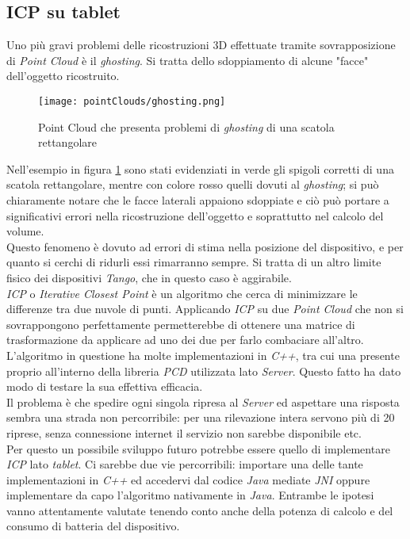 \subsection{ICP su tablet}
Uno più gravi problemi delle ricostruzioni 3D effettuate tramite sovrapposizione di \emph{Point Cloud} è il \emph{ghosting}. Si tratta dello sdoppiamento di alcune "facce" dell'oggetto ricostruito.\\
\begin{figure}[!h] 
    \centering 
    \texttt{[image: pointClouds/ghosting.png]} 
    \caption{Point Cloud che presenta problemi di \emph{ghosting} di una scatola rettangolare}
    \label{figure:pcloud_ghosting}
\end{figure}
Nell'esempio in figura \ref{figure:pcloud_ghosting} sono stati evidenziati in verde gli spigoli corretti di una scatola rettangolare, mentre con colore rosso quelli dovuti al \emph{ghosting}; si può chiaramente notare che le facce laterali appaiono sdoppiate e ciò può portare a significativi errori nella ricostruzione dell'oggetto e soprattutto nel calcolo del volume.\\
Questo fenomeno è dovuto ad errori di stima nella posizione del dispositivo, e per quanto si cerchi di ridurli essi rimarranno sempre. Si tratta di un altro limite fisico dei dispositivi \emph{Tango}, che in questo caso è aggirabile.\\
\emph{ICP} o \emph{Iterative Closest Point} è un algoritmo che cerca di minimizzare le differenze tra due nuvole di punti. Applicando \emph{ICP} su due \emph{Point Cloud} che non si sovrappongono perfettamente permetterebbe di ottenere una matrice di trasformazione da applicare ad uno dei due per farlo combaciare all'altro. L'algoritmo in questione ha molte implementazioni in \emph{C++}, tra cui una presente proprio all'interno della libreria \emph{PCD} utilizzata lato \emph{Server}. Questo fatto ha dato modo di testare la sua effettiva efficacia.\\
Il problema è che spedire ogni singola ripresa al \emph{Server} ed aspettare una risposta sembra una strada non percorribile: per una rilevazione intera servono più di 20 riprese, senza connessione internet il servizio non sarebbe disponibile etc.\\
Per questo un possibile sviluppo futuro potrebbe essere quello di implementare \emph{ICP} lato \emph{tablet}. Ci sarebbe due vie percorribili: importare una delle tante implementazioni in \emph{C++} ed accedervi dal codice \emph{Java} mediate \emph{JNI} oppure implementare da capo l'algoritmo nativamente in \emph{Java}. Entrambe le ipotesi vanno attentamente valutate tenendo conto anche della potenza di calcolo e del consumo di batteria del dispositivo.


